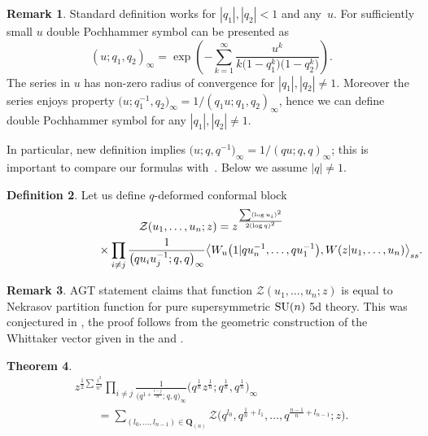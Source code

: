 \documentclass[pdftex]{sigma}
\numberwithin{equation}{section}
\newtheorem{Theorem}{Theorem}[section]
\theoremstyle{definition}
\newtheorem{Remark}[Theorem]{Remark}
\newtheorem{Definition}[Theorem]{Definition}
\newcommand{\Q}{\mathbf{Q}_{(n)}}
\begin{document}
\begin{Remark}
Standard definition works for $|q_1|, |q_2|<1$ and any~$u$. For sufficiently small $u$ double Pochhammer symbol can be presented as \[
(u;q_1, q_2)_{\infty} =\exp \left( -\sum_{k=1}^{\infty} \frac{u^k}{k\big(1-q_1^k\big)\big(1-q_2^k\big)} \right).
\]
 The series in $u$ has non-zero radius of convergence for $|q_1|, |q_2| \neq 1$. Moreover the series enjoys property $\big(u; q_1^{-1}, q_2\big)_{\infty} = 1/(q_1 u; q_1,q_2)_{\infty}$, hence we can define double Pochhammer symbol for any $|q_1|, |q_2| \neq 1$.

In particular, new definition implies $\big(u; q, q^{-1}\big)_{\infty} = 1/(qu; q,q)_{\infty}$; this is important to compare our formulas with~\cite{BGM}. Below we assume $|q| \neq 1$.
\end{Remark}

\begin{Definition}\label{def:conformal block}
Let us define $q$-deformed conformal block
\begin{gather}
\mathcal{Z} (u_1, \dots, u_n ; z) = z^{\frac{\sum (\log u_i)^2}{2 (\log q)^2}}\nonumber\\
\hphantom{\mathcal{Z} (u_1, \dots, u_n ; z) =}{}\times \prod_{i \neq j} \frac{1}{\big(qu_i u_j^{-1}; q, q\big)_{\infty}} \big\langle W_u\big(1|qu_n^{-1}, \dots, qu_1^{-1}\big) , W(z| u_1, \dots, u_n) \big\rangle_{ss}.\!\!\!\!\label{eq: def q-der conf block}
\end{gather}
\end{Definition}

\begin{Remark}
AGT statement claims that function $\mathcal{Z} (u_1, \dots, u_n ; z)$ is equal to Nekrasov partition function for pure supersymmetric ${\rm SU}(n)$ 5d theory. This was conjectured in \cite{AY10}, the proof follows from the geometric construction of the Whittaker vector given in the \cite{N12} and \cite{Ts}.
\end{Remark}

\begin{Theorem} \label{Theorem: the relation}
\begin{gather*}
z^{\frac12 \sum \frac{i^2}{n^2}} \prod_{i \neq j} \frac{1}{\big(q^{1+\frac{i-j}{n}}; q, q\big)_{\infty}} \big( q^{\frac{1}{n}} z^{\frac{1}{n}}; q^{\frac{1}{n}} ,q^{\frac{1}{n}} \big)_{\infty} \\
\qquad{} = \sum_{(l_0, \dots, l_{n-1}) \in \Q} \mathcal{Z} \big( q^{l_0}, q^{\frac{1}{n}+l_1}, \dots, q^{\frac{n-1}{n} + l_{n-1}}; z \big).
\end{gather*}
\end{Theorem}
\end{document}
